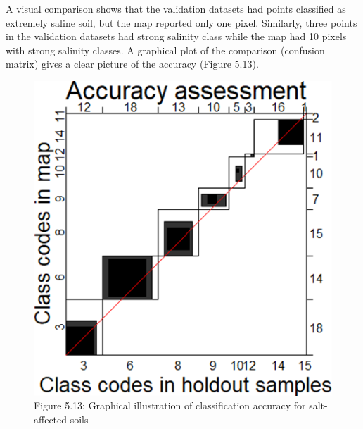 \documentclass[
  10pt,
  b5paper,
]{book}
\newenvironment{Shaded}{\begin{snugshade}}{\end{snugshade}}
\newcommand{\CommentTok}[1]{\textcolor[rgb]{0.56,0.35,0.01}{\textit{#1}}}
\newcommand{\DataTypeTok}[1]{\textcolor[rgb]{0.13,0.29,0.53}{#1}}
\newcommand{\KeywordTok}[1]{\textcolor[rgb]{0.13,0.29,0.53}{\textbf{#1}}}
\newcommand{\NormalTok}[1]{#1}
\newcommand{\OperatorTok}[1]{\textcolor[rgb]{0.81,0.36,0.00}{\textbf{#1}}}
\newcommand{\StringTok}[1]{\textcolor[rgb]{0.31,0.60,0.02}{#1}}
\begin{document}
A visual comparison shows that the validation datasets had points classified as extremely saline soil, but the map reported only one pixel. Similarly, three points in the validation datasets had strong salinity class while the map had 10 pixels with strong salinity classes. A graphical plot of the comparison (confusion matrix) gives a clear picture of the accuracy (Figure 5.13).

\begin{Shaded}
\end{Shaded}

\begin{figure}
\centering
\includegraphics{figures/images/Figure5.13.png}
\caption{Figure 5.13: Graphical illustration of classification accuracy for salt-affected soils}
\end{figure}
\end{document}
